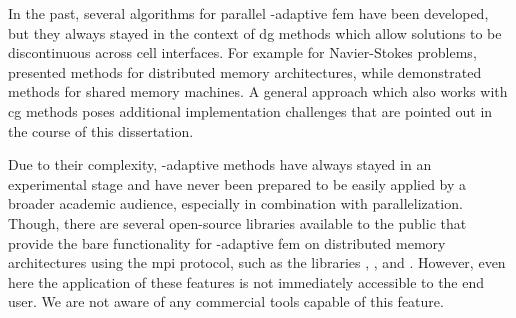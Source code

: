

In the past, several algorithms for parallel \hp-adaptive \gls{fem} have been developed, but they always stayed in the context of \gls{dg} methods which allow solutions to be discontinuous across cell interfaces. For example for Navier-Stokes problems, \textcites{paszynski2006}{chalmers2019} presented methods for distributed memory architectures, while \textcites{paszynski2011}{jomo2017} demonstrated methods for shared memory machines. A general approach which also works with \gls{cg} methods poses additional implementation challenges that are pointed out in the course of this dissertation. %


Due to their complexity, \hp-adaptive methods have always stayed in an experimental stage and have never been prepared to be easily applied by a broader academic audience, especially in combination with parallelization.
Though, there are several open-source libraries available to the public that provide the bare functionality for \hp-adaptive \gls{fem} on distributed memory architectures using the \gls{mpi} protocol, such as the libraries \phaml{} \parencite{mitchell2002,phaml1200}, \phg{} \parencite{zhang2019,phg094}, and \mofem{} \parencite{kaczmarczyk2020,mofem090}. However, even here the application of these features is not immediately accessible to the end user. We are not aware of any commercial tools capable of this feature.




